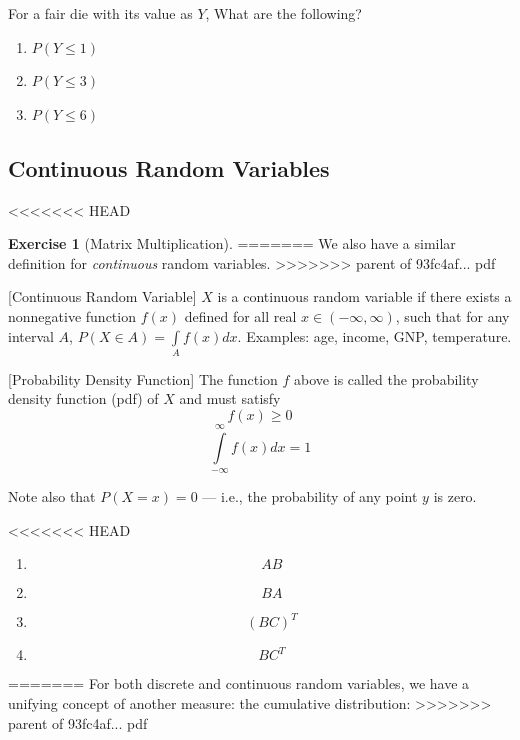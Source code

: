 \documentclass[]{book}
\providecommand{\tightlist}{%
  \setlength{\itemsep}{0pt}\setlength{\parskip}{0pt}}
\theoremstyle{definition}
\theoremstyle{definition}
\theoremstyle{definition}
\newtheorem{exercise}{Exercise}[chapter]
\theoremstyle{remark}
\begin{document}
\protect\hypertarget{exm:unnamed-chunk-77}{}{\label{exm:unnamed-chunk-77} }For a fair die with its value as \(Y\), What are the following?

\begin{enumerate}
\def\labelenumi{\arabic{enumi}.}
\tightlist
\item
  \(P(Y\le 1)\)
\item
  \(P(Y\le 3)\)
\item
  \(P(Y\le 6)\)
\end{enumerate}

\hypertarget{continuous-random-variables}{%
\subsection*{Continuous Random Variables}\label{continuous-random-variables}}

<<<<<<< HEAD
\begin{exercise}[Matrix Multiplication]
\protect\hypertarget{exr:matrixmulti1}{}{\label{exr:matrixmulti1} {} }
=======
We also have a similar definition for \emph{continuous} random variables.
>>>>>>> parent of 93fc4af... pdf

[Continuous Random Variable]
\protect\hypertarget{def:unnamed-chunk-78}{}{\label{def:unnamed-chunk-78} {} }
\(X\) is a continuous random variable if there exists a nonnegative function \(f(x)\) defined for all real \(x\in (-\infty,\infty)\), such that for any interval \(A\), \(P(X\in A)=\int\limits_A f(x)dx\). Examples: age, income, GNP, temperature.

[Probability Density Function]
\protect\hypertarget{def:unnamed-chunk-79}{}{\label{def:unnamed-chunk-79} {} }
The function \(f\) above is called the probability density function (pdf) of \(X\) and must satisfy
\[f(x)\ge 0\]
\[\int\limits_{-\infty}^\infty f(x)dx=1\]

Note also that \(P(X = x)=0\) --- i.e., the probability of any point \(y\) is zero.

<<<<<<< HEAD
\begin{enumerate}
\def\labelenumi{\arabic{enumi}.}
\tightlist
\item
  \[AB\]
\item
  \[BA\]
\item
  \[(BC)^T\]
\item
  \[BC^T\]
\end{enumerate}
\end{exercise}
=======
For both discrete and continuous random variables, we have a unifying concept of another measure: the cumulative distribution:
>>>>>>> parent of 93fc4af... pdf
\end{document}
